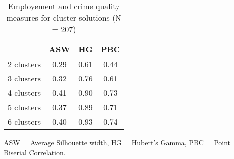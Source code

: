 \begin{table}[htp]
\footnotesize
\setlength{\tabcolsep}{35pt}
\renewcommand{\arraystretch}{1.3}
\begin{threeparttable}
\centering
\caption{Employement and crime quality measures for cluster solutions (N = 207)} 
\label{tab:quality_clusters_job_crime}
\begin{tabular}{lccc}
  \hline
 & ASW & HG & PBC \\ 
  \hline
2 clusters & 0.29 & 0.61 & 0.44 \\ 
  3 clusters & 0.32 & 0.76 & 0.61 \\ 
  4 clusters & 0.41 & 0.90 & 0.73 \\ 
  5 clusters & 0.37 & 0.89 & 0.71 \\ 
  6 clusters & 0.40 & 0.93 & 0.74 \\ 
   \hline
\end{tabular}
\begin{tablenotes}
\scriptsize
\item ASW = Average Silhouette width, HG = Hubert's Gamma, PBC = Point Biserial Correlation.
\end{tablenotes}
\end{threeparttable}
\end{table}
